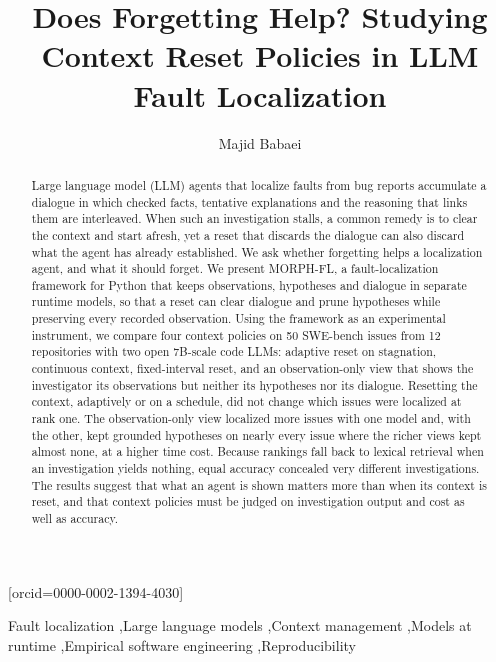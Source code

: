\documentclass[a4paper,fleqn]{cas-sc}
\begin{document}
\let\WriteBookmarks\relax
{}
\title[mode=title]{Does Forgetting Help? Studying Context Reset Policies in LLM Fault Localization}
\author[1]{Majid Babaei}[orcid=0000-0002-1394-4030]
\cormark[1]

\begin{abstract}
Large language model (LLM) agents that localize faults from bug reports accumulate a dialogue in which checked facts, tentative explanations and the reasoning that links them are interleaved. When such an investigation stalls, a common remedy is to clear the context and start afresh, yet a reset that discards the dialogue can also discard what the agent has already established. We ask whether forgetting helps a localization agent, and what it should forget. We present MORPH-FL, a fault-localization framework for Python that keeps observations, hypotheses and dialogue in separate runtime models, so that a reset can clear dialogue and prune hypotheses while preserving every recorded observation. Using the framework as an experimental instrument, we compare four context policies on 50 SWE-bench issues from 12 repositories with two open 7B-scale code LLMs: adaptive reset on stagnation, continuous context, fixed-interval reset, and an observation-only view that shows the investigator its observations but neither its hypotheses nor its dialogue. Resetting the context, adaptively or on a schedule, did not change which issues were localized at rank one. The observation-only view localized more issues with one model and, with the other, kept grounded hypotheses on nearly every issue where the richer views kept almost none, at a higher time cost. Because rankings fall back to lexical retrieval when an investigation yields nothing, equal accuracy concealed very different investigations. The results suggest that what an agent is shown matters more than when its context is reset, and that context policies must be judged on investigation output and cost as well as accuracy.
\end{abstract}

\begin{keywords}
Fault localization \sep Large language models \sep Context management \sep Models at runtime \sep Empirical software engineering \sep Reproducibility
\end{keywords}
\maketitle
\raggedbottom
\end{document}

